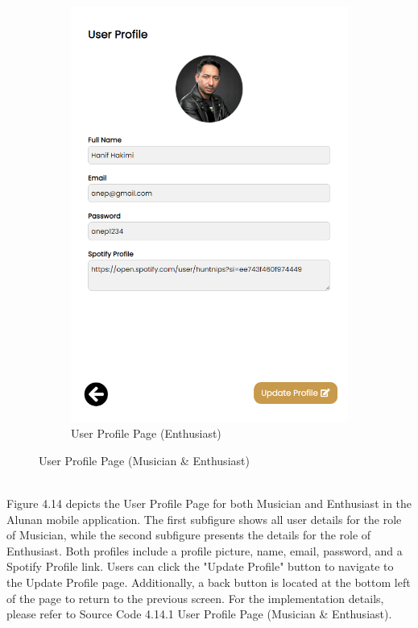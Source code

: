 \begin{enumerate}[1.]
\begin{figure}[h]
\begin{subfigure}[b]{0.4\textwidth}
            \includegraphics[width=\textwidth]{mainmatter/images/frontend/ss/User Profile3 (Musician-Enthusiast).png}
            \caption{User Profile Page (Enthusiast)}
            \label{fig:sub2}
        \end{subfigure}
        \caption{User Profile Page (Musician \& Enthusiast)}
        \label{fig:myfig53}
    \end{figure} \\
    Figure 4.14 depicts the User Profile Page for both Musician and Enthusiast in the Alunan mobile application. The first subfigure shows all user details for the role of Musician, while the second subfigure presents the details for the role of Enthusiast. Both profiles include a profile picture, name, email, password, and a Spotify Profile link. Users can click the "Update Profile" button to navigate to the Update Profile page. Additionally, a back button is located at the bottom left of the page to return to the previous screen. For the implementation details, please refer to Source Code 4.14.1 User Profile Page (Musician \& Enthusiast).

\end{enumerate}
